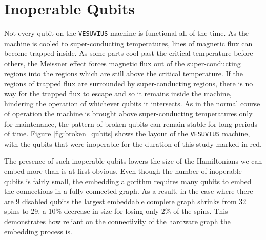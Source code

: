\section{Inoperable Qubits}
\label{sec:inop_qubits}
Not every qubit on the \texttt{VESUVIUS} machine is functional all of the time.  As the machine is cooled to super-conducting temperatures, lines of magnetic flux can become trapped inside.  As some parts cool past the critical temperature before others, the Meissner effect forces magnetic flux out of the super-conducting regions into the regions which are still above the critical temperature.  If the regions of trapped flux are surrounded by super-conducting regions, there is no way for the trapped flux to escape and so it remains inside the machine, hindering the operation of whichever qubits it intersects.  As in the normal course of operation the machine is brought above super-conducting temperatures only for maintenance, the pattern of broken qubits can remain stable for long periods of time.  Figure \ref{fig:broken_qubits} shows the layout of the \texttt{VESUVIUS} machine, with the qubits that were inoperable for the duration of this study marked in red.

The presence of such inoperable qubits lowers the size of the Hamiltonians we can embed more than is at first obvious.  Even though the number of inoperable qubits is fairly small, the embedding algorithm requires many qubits to embed the connections in a fully connected graph.  As a result, in the case where there are 9 disabled qubits the largest embeddable complete graph shrinks from 32 spins to 29, a 10\% decrease in size for losing only 2\% of the spins.  This demonstrates how reliant on the connectivity of the hardware graph the embedding process is.

